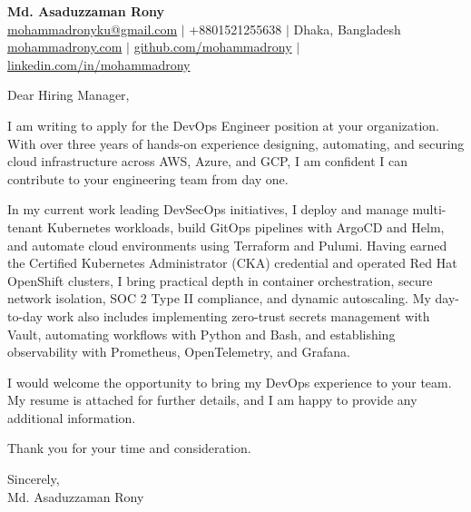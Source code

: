 \documentclass[a4paper,10pt]{article}
\begin{document}
\begin{center}
    {\LARGE \textbf{Md. Asaduzzaman Rony}}\\
    \vspace{3pt}
    \href{mailto:mohammadronyku@gmail.com}{mohammadronyku@gmail.com} $\vert$
    +8801521255638 $\vert$
    Dhaka, Bangladesh\\
    \href{https://mohammadrony.com}{mohammadrony.com} $\vert$
    \href{https://github.com/mohammadrony}{github.com/mohammadrony} $\vert$
    \href{https://www.linkedin.com/in/mohammadrony/}{linkedin.com/in/mohammadrony}
\end{center}

\vspace{14pt}

Dear Hiring Manager,

I am writing to apply for the DevOps Engineer position at your organization. With over three years of hands-on experience designing, automating, and securing cloud infrastructure across AWS, Azure, and GCP, I am confident I can contribute to your engineering team from day one.

In my current work leading DevSecOps initiatives, I deploy and manage multi-tenant Kubernetes workloads, build GitOps pipelines with ArgoCD and Helm, and automate cloud environments using Terraform and Pulumi. Having earned the Certified Kubernetes Administrator (CKA) credential and operated Red Hat OpenShift clusters, I bring practical depth in container orchestration, secure network isolation, SOC 2 Type II compliance, and dynamic autoscaling. My day-to-day work also includes implementing zero-trust secrets management with Vault, automating workflows with Python and Bash, and establishing observability with Prometheus, OpenTelemetry, and Grafana.

I would welcome the opportunity to bring my DevOps experience to your team. My resume is attached for further details, and I am happy to provide any additional information.

Thank you for your time and consideration.

\vspace{14pt}

Sincerely,\\
Md. Asaduzzaman Rony
\end{document}
